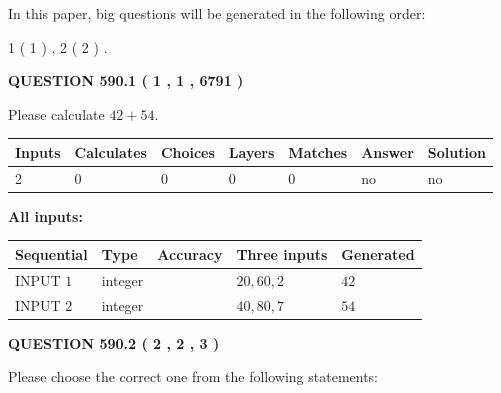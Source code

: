 \documentclass[12pt]{article}
\begin{document}
\vspace{0.2in}
   
In this paper, big questions will be generated in the following order: 
   
   
   1 ( 1 )
 ,
   2 ( 2 )
 .
  
\vspace{0.2in}
  
{\textbf{\Large{QUESTION
590.1 
 ( 1 , 1 , 6791 )
}}}
  
  
 
Please calculate $ %
42 +  %
54 $.
 
 
   
   
   
   
\noindent\begin{tabular}{|l|l|l|l|l|l|l|}
 \hline
Inputs & Calculates & Choices & Layers & Matches & Answer & Solution \\ \hline
 2  & 
 0  & 
 0
  & 
 0  & 
 0  & 
  no & 
  no 
  \\ \hline
 \end{tabular}
   
   
   
   
\noindent{}
   
   
   
   
\noindent\vspace{0.1in}\hspace{-0.08in} {\textbf{\Large{All inputs: }}}
   
   
  
  
\noindent\begin{tabular}{|l|l|l|l|l|}
\hline
 Sequential & Type & Accuracy & Three inputs & Generated \\ 
\hline
 
 
  INPUT $  1 $ & integer &  & $
 20
 , 
 60
 , 
 2
 $ & $ 42 $ 
 \\  \hline  
 
 
  INPUT $  2 $ & integer &  & $
 40
 , 
 80
 , 
 7
 $ & $ 54 $ 
 \\  \hline  
 \end{tabular}
   
   
  
\vspace{0.2in}
  
{\textbf{\Large{QUESTION
590.2 
 ( 2 , 2 , 3 )
}}}
  
  
Please choose the correct one from the following statements:
 
\end{document}
